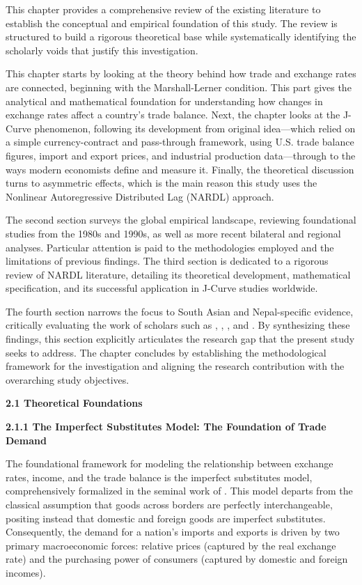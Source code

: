 \documentclass[12pt]{article}
\begin{document}
This chapter provides a comprehensive review of the existing literature to establish the conceptual and empirical foundation of this study. The review is structured to build a rigorous theoretical base while systematically identifying the scholarly voids that justify this investigation.

This chapter starts by looking at the theory behind how trade and exchange rates are connected, beginning with the Marshall-Lerner condition. This part gives the analytical and mathematical foundation for understanding how changes in exchange rates affect a country's trade balance. Next, the chapter looks at the J-Curve phenomenon, following its development from \textcite{Magee1973-dr} original idea—which relied on a simple currency-contract and pass-through framework, using U.S. trade balance figures, import and export prices, and industrial production data—through to the ways modern economists define and measure it. Finally, the theoretical discussion turns to asymmetric effects, which is the main reason this study uses the Nonlinear Autoregressive Distributed Lag (NARDL) approach.

The second section surveys the global empirical landscape, reviewing foundational studies from the 1980s and 1990s, as well as more recent bilateral and regional analyses. Particular attention is paid to the methodologies employed and the limitations of previous findings. The third section is dedicated to a rigorous review of NARDL literature, detailing its theoretical development, mathematical specification, and its successful application in J-Curve studies worldwide.

The fourth section narrows the focus to South Asian and Nepal-specific evidence, critically evaluating the work of scholars such as \textcite{chaulagai2015}, \textcite{Bishwakarma2024-fa}, \textcite{pathak2020}, and \textcite{Adhikari2020-rr}. By synthesizing these findings, this section explicitly articulates the research gap that the present study seeks to address. The chapter concludes by establishing the methodological framework for the investigation and aligning the research contribution with the overarching study objectives.

\vspace{0.5cm}
\noindent\textbf{2.1 Theoretical Foundations}

\noindent\textbf{2.1.1 The Imperfect Substitutes Model: The Foundation of Trade Demand}

The foundational framework for modeling the relationship between exchange rates, income, and the trade balance is the imperfect substitutes model, comprehensively formalized in the seminal work of \textcite{Goldstein1985}. This model departs from the classical assumption that goods across borders are perfectly interchangeable, positing instead that domestic and foreign goods are imperfect substitutes. Consequently, the demand for a nation's imports and exports is driven by two primary macroeconomic forces: relative prices (captured by the real exchange rate) and the purchasing power of consumers (captured by domestic and foreign incomes).
\end{document}
